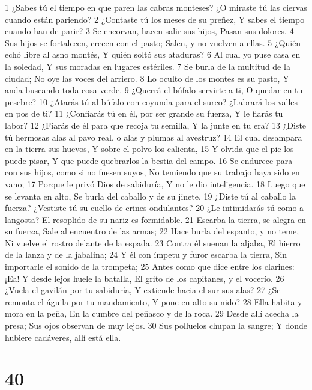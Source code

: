 1 ¿Sabes tú el tiempo en que paren las cabras monteses?
¿O miraste tú las ciervas cuando están pariendo? 
2 ¿Contaste tú los meses de su preñez,
Y sabes el tiempo cuando han de parir?
3 Se encorvan, hacen salir sus hijos,
Pasan sus dolores.
4 Sus hijos se fortalecen, crecen con el pasto;
Salen, y no vuelven a ellas. 
5 ¿Quién echó libre al asno montés,
Y quién soltó sus ataduras?
6 Al cual yo puse casa en la soledad,
Y sus moradas en lugares estériles.
7 Se burla de la multitud de la ciudad;
No oye las voces del arriero.
8 Lo oculto de los montes es su pasto,
Y anda buscando toda cosa verde.
9 ¿Querrá el búfalo servirte a ti,
O quedar en tu pesebre?
10 ¿Atarás tú al búfalo con coyunda para el surco?
¿Labrará los valles en pos de ti?
11 ¿Confiarás tú en él, por ser grande su fuerza,
Y le fiarás tu labor? 
12 ¿Fiarás de él para que recoja tu semilla,
Y la junte en tu era?
13 ¿Diste tú hermosas alas al pavo real,
o alas y plumas al avestruz?
14 El cual desampara en la tierra sus huevos,
Y sobre el polvo los calienta,
15 Y olvida que el pie los puede pisar,
Y que puede quebrarlos la bestia del campo.
16 Se endurece para con sus hijos, como si no fuesen suyos,
No temiendo que su trabajo haya sido en vano;
17 Porque le privó Dios de sabiduría,
Y no le dio inteligencia.
18 Luego que se levanta en alto, 
Se burla del caballo y de su jinete.
19 ¿Diste tú al caballo la fuerza?
¿Vestiste tú su cuello de crines ondulantes? 
20 ¿Le intimidarás tú como a langosta?
El resoplido de su nariz es formidable.
21 Escarba la tierra, se alegra en su fuerza,
Sale al encuentro de las armas;
22 Hace burla del espanto, y no teme,
Ni vuelve el rostro delante de la espada.
23 Contra él suenan la aljaba,
El hierro de la lanza y de la jabalina;
24 Y él con ímpetu y furor escarba la tierra,
Sin importarle el sonido de la trompeta;
25 Antes como que dice entre los clarines: ¡Ea!
Y desde lejos huele la batalla,
El grito de los capitanes, y el vocerío.
26 ¿Vuela el gavilán por tu sabiduría,
Y extiende hacia el sur sus alas?
27 ¿Se remonta el águila por tu mandamiento,
Y pone en alto su nido?
28 Ella habita y mora en la peña,
En la cumbre del peñasco y de la roca.
29 Desde allí acecha la presa;
Sus ojos observan de muy lejos.
30 Sus polluelos chupan la sangre;
Y donde hubiere cadáveres, allí está ella.

\chapter{40}

